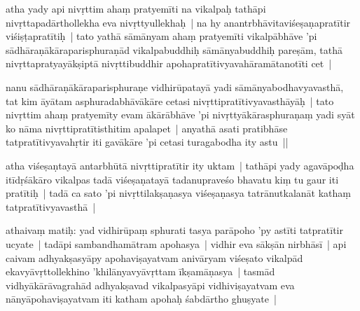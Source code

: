 \documentclass[article,12pt,a4paper]{memoir}%
\newcounter{parCount}
\begin{document}
	  
	  \pstart \leavevmode%
	\label{thakur75-58.13}atha yady api nivṛttim ahaṃ pratyemīti na vikalpaḥ tathāpi nivṛttapadārthollekha eva nivṛttyullekhaḥ | na hy anantrbhāvitaviśeṣaṇapratītir viśiṣṭapratītiḥ | tato yathā sāmānyam ahaṃ pratyemīti vikalpābhāve 'pi sādhāraṇākāraparisphuraṇād vikalpabuddhiḥ sāmānyabuddhiḥ pareṣām, tathā nivṛttapratyayākṣiptā nivṛttibuddhir apohapratītivyavahāramātanotīti cet |
	{}
	\pend%
      

	  
	  \pstart \leavevmode%
	\label{thakur75-58.18}nanu sādhāraṇākāraparisphuraṇe vidhirūpatayā yadi sāmānyabodhavyavasthā, tat kim āyātam asphuradabhāvākāre cetasi nivṛttipratītivyavasthāyāḥ | tato nivṛttim ahaṃ pratyemīty evam ākārābhāve 'pi nivṛttyākārasphuraṇaṃ yadi syāt ko nāma nivṛttipratītisthitim apalapet | anyathā asati pratibhāse tatpratītivyavahṛtir iti gavākāre 'pi cetasi turagabodha ity astu ||
	{}
	\pend%
      

	  
	  \pstart \leavevmode%
	\label{thakur75-58.23}atha viśeṣaṇtayā antarbhūtā nivṛttipratītir ity uktam | tathāpi yady agavāpoḍha itīdṛśākāro vikalpas tadā viśeṣaṇatayā tadanupraveśo bhavatu kiṃ tu gaur iti pratītiḥ | tadā ca sato 'pi nivṛttilakṣaṇasya viśeṣaṇasya tatrānutkalanāt kathaṃ tatpratītivyavasthā |
	{}
	\pend%
      

	  
	  \pstart \leavevmode%
	\label{thakur75-58.27}athaivaṃ matiḥ: yad vidhirūpaṃ sphurati tasya parāpoho 'py astīti tatpratītir ucyate | tadāpi sambandhamātram apohasya | vidhir eva sākṣān nirbhāsī | api caivam adhyakṣasyāpy apohaviṣayatvam anivāryam viśeṣato vikalpād ekavyāvṛttollekhino 'khilānyavyāvṛttam īkṣamāṇasya | tasmād vidhyākārāvagrahād adhyakṣavad vikalpasyāpi vidhiviṣayatvam eva nānyāpohaviṣayatvam iti katham apohaḥ śabdārtho ghuṣyate | 
	{}
	\pend%
      
\end{document}
